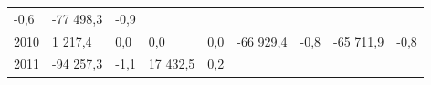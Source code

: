 \begin{longtable}[]{@{}lllllllll@{}}
\begin{minipage}[t]{0.06\columnwidth}
-0,6\strut
\end{minipage} & \begin{minipage}[t]{0.09\columnwidth}\raggedright
-77 498,3\strut
\end{minipage} & \begin{minipage}[t]{0.06\columnwidth}\raggedright
-0,9\strut
\end{minipage}\tabularnewline
\begin{minipage}[t]{0.05\columnwidth}\raggedright
2010\strut
\end{minipage} & \begin{minipage}[t]{0.10\columnwidth}\raggedright
1 217,4\strut
\end{minipage} & \begin{minipage}[t]{0.06\columnwidth}\raggedright
0,0\strut
\end{minipage} & \begin{minipage}[t]{0.16\columnwidth}\raggedright
0,0\strut
\end{minipage} & \begin{minipage}[t]{0.06\columnwidth}\raggedright
0,0\strut
\end{minipage} & \begin{minipage}[t]{0.12\columnwidth}\raggedright
-66 929,4\strut
\end{minipage} & \begin{minipage}[t]{0.06\columnwidth}\raggedright
-0,8\strut
\end{minipage} & \begin{minipage}[t]{0.09\columnwidth}\raggedright
-65 711,9\strut
\end{minipage} & \begin{minipage}[t]{0.06\columnwidth}\raggedright
-0,8\strut
\end{minipage}\tabularnewline
\begin{minipage}[t]{0.05\columnwidth}\raggedright
2011\strut
\end{minipage} & \begin{minipage}[t]{0.10\columnwidth}\raggedright
-94 257,3\strut
\end{minipage} & \begin{minipage}[t]{0.06\columnwidth}\raggedright
-1,1\strut
\end{minipage} & \begin{minipage}[t]{0.16\columnwidth}\raggedright
17 432,5\strut
\end{minipage} & \begin{minipage}[t]{0.06\columnwidth}\raggedright
0,2\strut
\end{minipage} & \begin{minipage}[t]{0.12\columnwidth}\raggedright

\end{minipage}
\end{longtable}
